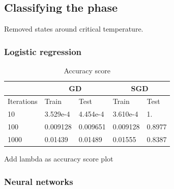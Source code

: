 \subsection{Classifying the phase}
Removed states around critical temperature.

\subsubsection{Logistic regression}
\begin{table} [H]
	\caption{Accuracy score}
	\begin{tabularx}{\textwidth}{l|XX|XX} \hline\hline
		\label{tab:logistic_regression}
		& \multicolumn{2}{c}{\textbf{GD}}&\multicolumn{2}{c}{\textbf{SGD}}\\ \hline
		Iterations&Train&Test&Train&Test\\ \hline
		10 & 3.529e-4 & 4.454e-4 & 3.610e-4 & 1.\\
		100 & 0.009128 & 0.009651 & 0.009128 & 0.8977 \\
		1000 & 0.01439 & 0.01489 & 0.01555 & 0.8387 \\ \hline\hline
	\end{tabularx}
\end{table}

Add lambda as accuracy score plot

\subsubsection{Neural networks}






